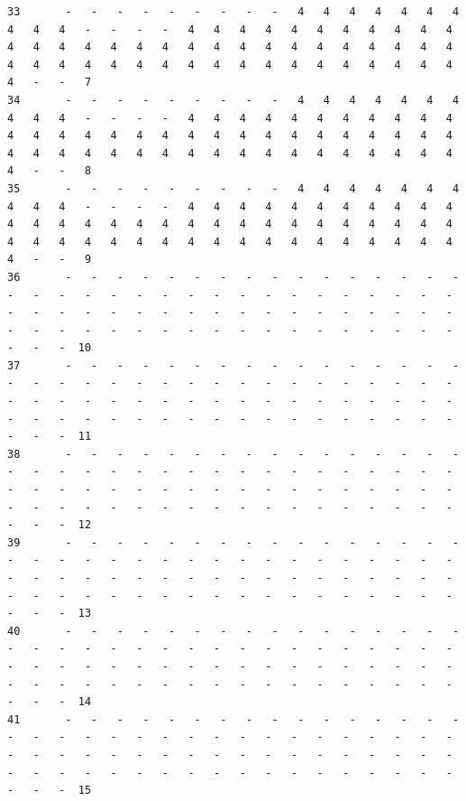 \documentclass[11pt,a4paper]{article}
\begin{document}
\begin{landscape}
\begin{verbatim}
33       -   -   -   -   -   -   -   -   -   4   4   4   4   4   4   4   4   4   4   -   -   -   -   4   4   4   4   4   4   4   4   4   4   4   4   4   4   4   4   4   4   4   4   4   4   4   4   4   4   4   4   4   4   4   4   4   4   4   4   4   4   4   4   4   4   4   4   4   4   4   4   -   -   7
34       -   -   -   -   -   -   -   -   -   4   4   4   4   4   4   4   4   4   4   -   -   -   -   4   4   4   4   4   4   4   4   4   4   4   4   4   4   4   4   4   4   4   4   4   4   4   4   4   4   4   4   4   4   4   4   4   4   4   4   4   4   4   4   4   4   4   4   4   4   4   4   -   -   8
35       -   -   -   -   -   -   -   -   -   4   4   4   4   4   4   4   4   4   4   -   -   -   -   4   4   4   4   4   4   4   4   4   4   4   4   4   4   4   4   4   4   4   4   4   4   4   4   4   4   4   4   4   4   4   4   4   4   4   4   4   4   4   4   4   4   4   4   4   4   4   4   -   -   9
36       -   -   -   -   -   -   -   -   -   -   -   -   -   -   -   -   -   -   -   -   -   -   -   -   -   -   -   -   -   -   -   -   -   -   -   -   -   -   -   -   -   -   -   -   -   -   -   -   -   -   -   -   -   -   -   -   -   -   -   -   -   -   -   -   -   -   -   -   -   -   -   -   -  10
37       -   -   -   -   -   -   -   -   -   -   -   -   -   -   -   -   -   -   -   -   -   -   -   -   -   -   -   -   -   -   -   -   -   -   -   -   -   -   -   -   -   -   -   -   -   -   -   -   -   -   -   -   -   -   -   -   -   -   -   -   -   -   -   -   -   -   -   -   -   -   -   -   -  11
38       -   -   -   -   -   -   -   -   -   -   -   -   -   -   -   -   -   -   -   -   -   -   -   -   -   -   -   -   -   -   -   -   -   -   -   -   -   -   -   -   -   -   -   -   -   -   -   -   -   -   -   -   -   -   -   -   -   -   -   -   -   -   -   -   -   -   -   -   -   -   -   -   -  12
39       -   -   -   -   -   -   -   -   -   -   -   -   -   -   -   -   -   -   -   -   -   -   -   -   -   -   -   -   -   -   -   -   -   -   -   -   -   -   -   -   -   -   -   -   -   -   -   -   -   -   -   -   -   -   -   -   -   -   -   -   -   -   -   -   -   -   -   -   -   -   -   -   -  13
40       -   -   -   -   -   -   -   -   -   -   -   -   -   -   -   -   -   -   -   -   -   -   -   -   -   -   -   -   -   -   -   -   -   -   -   -   -   -   -   -   -   -   -   -   -   -   -   -   -   -   -   -   -   -   -   -   -   -   -   -   -   -   -   -   -   -   -   -   -   -   -   -   -  14
41       -   -   -   -   -   -   -   -   -   -   -   -   -   -   -   -   -   -   -   -   -   -   -   -   -   -   -   -   -   -   -   -   -   -   -   -   -   -   -   -   -   -   -   -   -   -   -   -   -   -   -   -   -   -   -   -   -   -   -   -   -   -   -   -   -   -   -   -   -   -   -   -   -  15

\end{verbatim}
\end{landscape}
\end{document}
